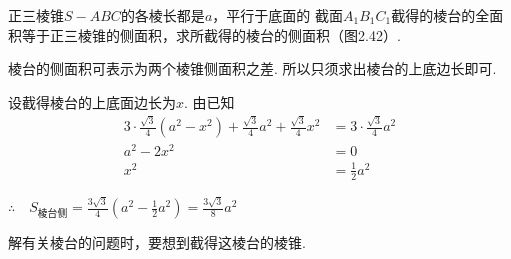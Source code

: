 \noindent
\begin{minipage}{.6\textwidth}
\begin{example}
    正三棱锥$S-ABC$的各棱长都是$a$，平行于底面的
    截面$A_1B_1C_1$截得的棱台的全面积等于正三棱锥的侧面积，求所截得的棱台的侧面积（图2.42）.
\end{example}

\begin{analyze}
棱台的侧面积可表示为两个棱锥侧面积之差. 所以只须求出棱台的上底边长即可.
\end{analyze}
\end{minipage}
\hfill
\begin{minipage}{.35\textwidth}
\centering
{}
\end{minipage}

\begin{solution}
设截得棱台的上底面边长为$x$. 由已知
\[\begin{split}
    3\cdot \frac{\sqrt{3}}{4}(a^2-x^2)+\frac{\sqrt{3}}{4}a^2+\frac{\sqrt{3}}{4}x^2&=3\cdot \frac{\sqrt{3}}{4}a^2\\
    a^2-2x^2&=0\\
    x^2&=\frac{1}{2}a^2
\end{split}\]

$\therefore\quad S_{\text{棱台侧}}=\frac{3\sqrt{3}}{4}\left(a^2-\frac{1}{2}a^2\right)=\frac{3\sqrt{3}}{8}a^2$
\end{solution}

\begin{remark}
解有关棱台的问题时，要想到截得这棱台的棱锥.
\end{remark}


